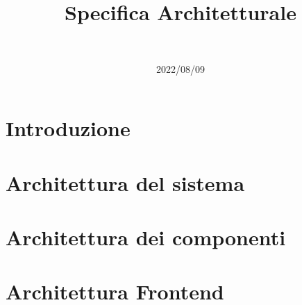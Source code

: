 \documentclass{classes/base}
\title{Specifica Architetturale}
\date{2022/08/09}
\author{\\ \tommaso}
\begin{document}
	\maketitle
	\newpage
	
	\newpage
	\tableofcontents
	\newpage
	\listoffigures
  
	\newpage
	\section{Introduzione}
	

	\newpage
	\section{Architettura del sistema}
	

	\newpage
	\section{Architettura dei componenti}
	

	\newpage
	\section{Architettura Frontend}
	
\end{document}
